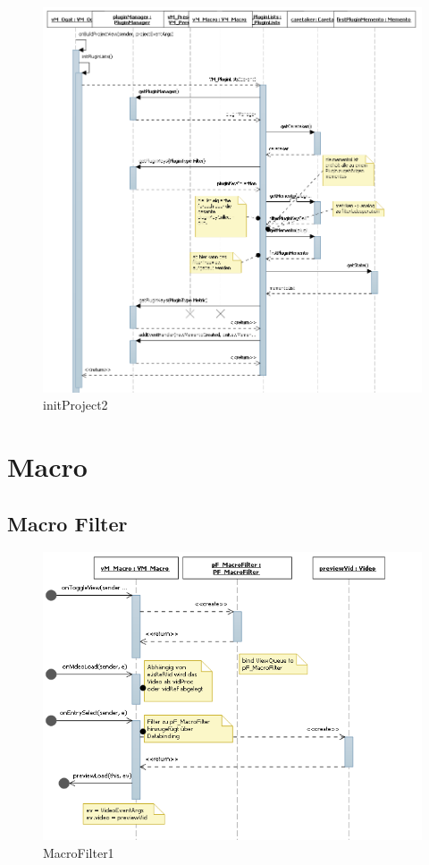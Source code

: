\begin{figure}[H]
\includegraphics[width=\linewidth]{bilder/Sequenzdiagramm/initProject2.png}
\caption{initProject2}
\end{figure}

\newpage
\section{Macro}
\subsection{Macro Filter}
\begin{figure}[H]
\includegraphics[width=\linewidth]{bilder/Sequenzdiagramm/Macro1.png}
\caption{MacroFilter1}
\end{figure}

